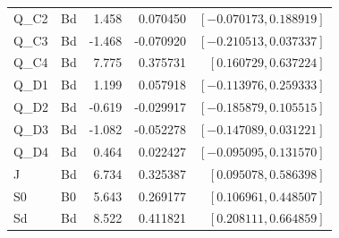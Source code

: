 \begin{longtable}{llrrr}
Q\_C2 & Bd & 1.458 & 0.070450 & $[-0.070173, 0.188919]$\\
Q\_C3 & Bd & -1.468 & -0.070920 & $[-0.210513, 0.037337]$\\
Q\_C4 & Bd & 7.775 & 0.375731 & $[0.160729, 0.637224]$\\
Q\_D1 & Bd & 1.199 & 0.057918 & $[-0.113976, 0.259333]$\\
Q\_D2 & Bd & -0.619 & -0.029917 & $[-0.185879, 0.105515]$\\
Q\_D3 & Bd & -1.082 & -0.052278 & $[-0.147089, 0.031221]$\\
Q\_D4 & Bd & 0.464 & 0.022427 & $[-0.095095, 0.131570]$\\
J & Bd & 6.734 & 0.325387 & $[0.095078, 0.586398]$\\
S0 & B0 & 5.643 & 0.269177 & $[0.106961, 0.448507]$\\
Sd & Bd & 8.522 & 0.411821 & $[0.208111, 0.664859]$\\
\bottomrule\end{longtable}\normalsize
